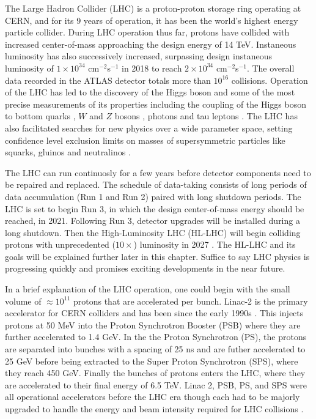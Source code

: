  
The Large Hadron Collider (LHC) is a proton-proton storage ring operating at CERN, and for its 9 years of operation, it has been the world's highest energy particle collider. 
During LHC operation thus far, protons have collided with increased center-of-mass approaching the design energy of 14 TeV. Instaneous luminosity has also successively increased, surpassing design instaneous luminosity of $1\times10^{34}$ cm$^{-2}$s$^{-1}$ in 2018 to reach $2\times10^{34}$ cm$^{-2}$s$^{-1}$\cite{CERNnews1}. The overall data recorded in the ATLAS detector totals more than $10^{16}$ collisions. Operation of the LHC has led to the discovery of the Higgs boson and some of the most precise measurements of its properties including the coupling of the Higgs boson to bottom quarks \cite{Aaboud_2018_0}, $W$ and $Z$ bosons \cite{Aaboud_2019, Aaboud_2018}, photons \cite{Aaboud_2018_2} and tau leptons \cite{Aaboud_2019_2}. The LHC has also facilitated searches for new physics over a wide parameter space, setting confidence level exclusion limits on masses of supersymmetric particles like squarks, gluinos and neutralinos \cite{ATLAS-CONF-2019-040}. 

The LHC can run continuosly for a few years before detector components need to be repaired and replaced. The schedule of data-taking consists of long periods of data accumulation (Run 1 and Run 2) paired with long shutdown periods. The LHC is set to begin Run 3, in which the design center-of-mass energy should be reached, in 2021. Following Run 3, detector upgrades will be installed during a long shutdown. Then the High-Luminosity LHC (HL-LHC) will begin colliding protons with unprecedented ($10\times$) luminosity in 2027 \cite{CERNnews2}. The HL-LHC and its goals will be explained further later in this chapter. Suffice to say LHC physics is progressing quickly and promises exciting developments in the near future. 

In a brief explanation of the LHC operation, one could begin with the small volume of $\approx 10^{11}$ protons that are accelerated per bunch. Linac-2 is the primary accelerator for CERN colliders and has been since the early 1990s \cite{LHCInjector}. This injects protons at 50 MeV into the Proton Synchrotron Booster (PSB) where they are further accelerated to 1.4 GeV. In the the Proton Synchrotron (PS), the protons are separated into bunches with a spacing of 25 ns and are futher accelerated to 25 GeV before being extracted to the Super Proton Synchrotron (SPS), where they reach 450 GeV. Finally the bunches of protons enters the LHC, where they are accelerated to their final energy of 6.5 TeV. Linac 2, PSB, PS, and SPS were all operational accelerators before the LHC era though each had to be majorly upgraded to handle the energy and beam intensity required for LHC collisions \cite{LHCInjector}. 

